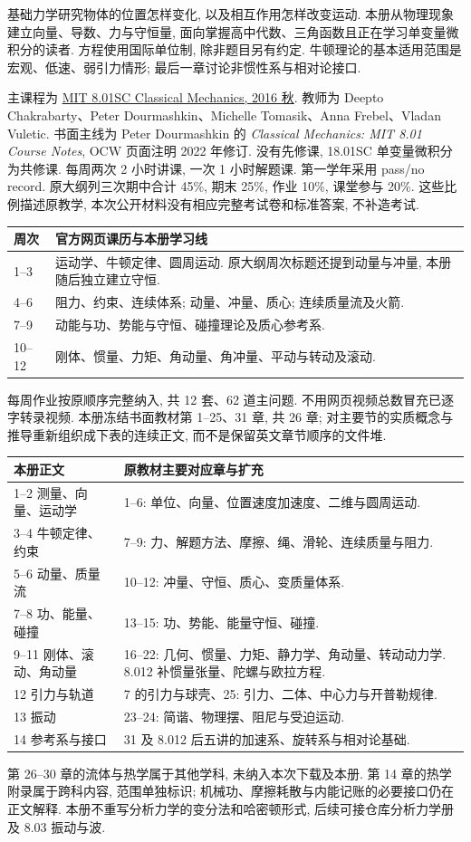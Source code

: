 \originalpreface
基础力学研究物体的位置怎样变化, 以及相互作用怎样改变运动. 本册从物理现象建立向量、导数、力与守恒量, 面向掌握高中代数、三角函数且正在学习单变量微积分的读者. 方程使用国际单位制, 除非题目另有约定. 牛顿理论的基本适用范围是宏观、低速、弱引力情形; 最后一章讨论非惯性系与相对论接口.

主课程为 \href{https://ocw.mit.edu/courses/8-01sc-classical-mechanics-fall-2016/}{MIT 8.01SC Classical Mechanics, 2016 秋}. 教师为 Deepto Chakrabarty、Peter Dourmashkin、Michelle Tomasik、Anna Frebel、Vladan Vuletic. 书面主线为 Peter Dourmashkin 的 \emph{Classical Mechanics: MIT 8.01 Course Notes}, OCW 页面注明 2022 年修订. 没有先修课, 18.01SC 单变量微积分为共修课. 每周两次 2 小时讲课, 一次 1 小时解题课. 第一学年采用 pass/no record. 原大纲列三次期中合计 45\%, 期末 25\%, 作业 10\%, 课堂参与 20\%. 这些比例描述原教学, 本次公开材料没有相应完整考试卷和标准答案, 不补造考试.

\begin{longtable}{@{}p{}p{}@{}}
\toprule 周次 & 官方网页课历与本册学习线 \\\midrule
1--3 & 运动学、牛顿定律、圆周运动. 原大纲周次标题还提到动量与冲量, 本册随后独立建立守恒. \\
4--6 & 阻力、约束、连续体系; 动量、冲量、质心; 连续质量流及火箭. \\
7--9 & 动能与功、势能与守恒、碰撞理论及质心参考系. \\
10--12 & 刚体、惯量、力矩、角动量、角冲量、平动与转动及滚动. \\\bottomrule
\end{longtable}
每周作业按原顺序完整纳入, 共 12 套、62 道主问题. 不用网页视频总数冒充已逐字转录视频. 本册冻结书面教材第 1--25、31 章, 共 26 章; 对主要节的实质概念与推导重新组织成下表的连续正文, 而不是保留英文章节顺序的文件堆.
\begin{longtable}{@{}p{}p{}@{}}
\toprule 本册正文 & 原教材主要对应章与扩充 \\\midrule
1--2 测量、向量、运动学 & 1--6: 单位、向量、位置速度加速度、二维与圆周运动. \\
3--4 牛顿定律、约束 & 7--9: 力、解题方法、摩擦、绳、滑轮、连续质量与阻力. \\
5--6 动量、质量流 & 10--12: 冲量、守恒、质心、变质量体系. \\
7--8 功、能量、碰撞 & 13--15: 功、势能、能量守恒、碰撞. \\
9--11 刚体、滚动、角动量 & 16--22: 几何、惯量、力矩、静力学、角动量、转动动力学. 8.012 补惯量张量、陀螺与欧拉方程. \\
12 引力与轨道 & 7 的引力与球壳、25: 引力、二体、中心力与开普勒规律. \\
13 振动 & 23--24: 简谐、物理摆、阻尼与受迫运动. \\
14 参考系与接口 & 31 及 8.012 后五讲的加速系、旋转系与相对论基础. \\\bottomrule
\end{longtable}
第 26--30 章的流体与热学属于其他学科, 未纳入本次下载及本册. 第 14 章的热学附录属于跨科内容, 范围单独标识; 机械功、摩擦耗散与内能记账的必要接口仍在正文解释. 本册不重写分析力学的变分法和哈密顿形式, 后续可接仓库分析力学册及 8.03 振动与波.

